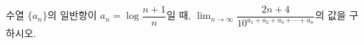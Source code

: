 수열 $\{a_n\}$의 일반항이 $a_n=\log\dfrac{n+1}{n}$일 때, $\displaystyle\lim_{n\to\infty}\dfrac{2n+4}{10^{a_1+a_2+a_3+\cdots+a_n}}$의 값을 구하시오.

